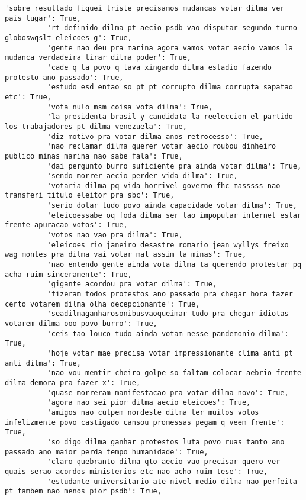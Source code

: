 \documentclass[11pt]{article}
\begin{document}
\begin{Verbatim}[commandchars=\\\{\}]
          'sobre resultado fiquei triste precisamos mudancas votar dilma ver pais lugar': True,
          'rt definido dilma pt aecio psdb vao disputar segundo turno globoswqslt eleicoes g': True,
          'gente nao deu pra marina agora vamos votar aecio vamos la mudanca verdadeira tirar dilma poder': True,
          'cade q ta povo q tava xingando dilma estadio fazendo protesto ano passado': True,
          'estudo esd entao so pt pt corrupto dilma corrupta sapatao etc': True,
          'vota nulo msm coisa vota dilma': True,
          'la presidenta brasil y candidata la reeleccion el partido los trabajadores pt dilma venezuela': True,
          'diz motivo pra votar dilma anos retrocesso': True,
          'nao reclamar dilma querer votar aecio roubou dinheiro publico minas marina nao sabe fala': True,
          'dai pergunto burro suficiente pra ainda votar dilma': True,
          'sendo morrer aecio perder vida dilma': True,
          'votaria dilma pq vida horrivel governo fhc masssss nao transferi titulo eleitor pra sbc': True,
          'serio dotar tudo povo ainda capacidade votar dilma': True,
          'eleicoessabe oq foda dilma ser tao impopular internet estar frente apuracao votos': True,
          'votos nao vao pra dilma': True,
          'eleicoes rio janeiro desastre romario jean wyllys freixo wag montes pra dilma vai votar mal assim la minas': True,
          'nao entendo gente ainda vota dilma ta querendo protestar pq acha ruim sinceramente': True,
          'gigante acordou pra votar dilma': True,
          'fizeram todos protestos ano passado pra chegar hora fazer certo votarem dilma olha decepcionante': True,
          'seadilmaganharosonibusvaoqueimar tudo pra chegar idiotas votarem dilma ooo povo burro': True,
          'ceis tao louco tudo ainda votam nesse pandemonio dilma': True,
          'hoje votar mae precisa votar impressionante clima anti pt anti dilma': True,
          'nao vou mentir cheiro golpe so faltam colocar aebrio frente dilma demora pra fazer x': True,
          'quase morreram manifestacao pra votar dilma novo': True,
          'agora nao sei pior dilma aecio eleicoes': True,
          'amigos nao culpem nordeste dilma ter muitos votos infelizmente povo castigado cansou promessas pegam q veem frente': True,
          'so digo dilma ganhar protestos luta povo ruas tanto ano passado ano maior perda tempo humanidade': True,
          'claro quebranto dilma qto aecio vao precisar quero ver quais serao acordos ministerios etc nao acho ruim tese': True,
          'estudante universitario ate nivel medio dilma nao perfeita pt tambem nao menos pior psdb': True,

\end{Verbatim}
\end{document}
